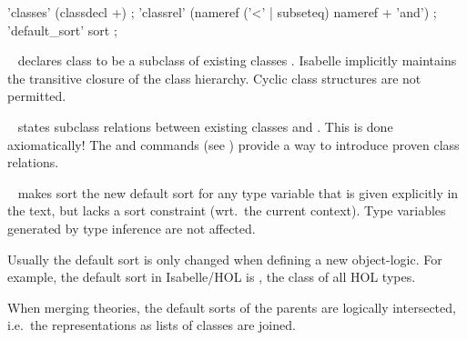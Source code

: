 \begin{isabellebody}
\begin{isamarkuptext}
  \begin{rail}
    'classes' (classdecl +)
    ;
    'classrel' (nameref ('<' | subseteq) nameref + 'and')
    ;
    'default\_sort' sort
    ;
  \end{rail}

  \begin{description}

  \item \hyperlink{command.classes}{\mbox{}}~ declares class
   to be a subclass of existing classes .
  Isabelle implicitly maintains the transitive closure of the class
  hierarchy.  Cyclic class structures are not permitted.

  \item \hyperlink{command.classrel}{\mbox{}}~ states subclass
  relations between existing classes  and .
  This is done axiomatically!  The \hyperlink{command.subclass}{\mbox{}} and
  \hyperlink{command.instance}{\mbox{}} commands (see ) provide
  a way to introduce proven class relations.

  \item \hyperlink{command.default-sort}{\mbox{}}~ makes sort  the
  new default sort for any type variable that is given explicitly in
  the text, but lacks a sort constraint (wrt.\ the current context).
  Type variables generated by type inference are not affected.

  Usually the default sort is only changed when defining a new
  object-logic.  For example, the default sort in Isabelle/HOL is
  , the class of all HOL types.

  When merging theories, the default sorts of the parents are
  logically intersected, i.e.\ the representations as lists of classes
  are joined.


\end{description}
\end{isamarkuptext}
\end{isabellebody}
